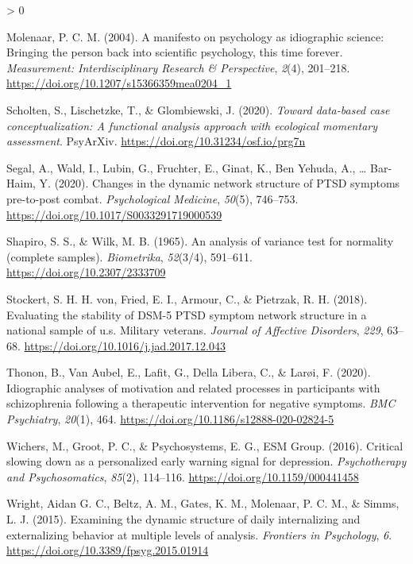 \documentclass[
  english,
  man]{apa6}
\newlength{\cslhangindent}
\newenvironment{CSLReferences}[2] %
 {%
  \setlength{\parindent}{0pt}
  \ifodd #1 \everypar{\setlength{\hangindent}{\cslhangindent}}\ignorespaces\fi
  \ifnum #2 > 0
  \setlength{\parskip}{#2\baselineskip}
  \fi
 }%
 {}
\begin{document}
\begin{CSLReferences}{1}{0}
\leavevmode\hypertarget{ref-Molenaar2004}{}%
Molenaar, P. C. M. (2004). A manifesto on psychology as idiographic science: Bringing the person back into scientific psychology, this time forever. \emph{Measurement: Interdisciplinary Research \& Perspective}, \emph{2}(4), 201--218. \url{https://doi.org/10.1207/s15366359mea0204_1}

\leavevmode\hypertarget{ref-ScholtenEtAl2020}{}%
Scholten, S., Lischetzke, T., \& Glombiewski, J. (2020). \emph{Toward data-based case conceptualization: A functional analysis approach with ecological momentary assessment}. PsyArXiv. \url{https://doi.org/10.31234/osf.io/prg7n}

\leavevmode\hypertarget{ref-SegalEtAl2020}{}%
Segal, A., Wald, I., Lubin, G., Fruchter, E., Ginat, K., Ben Yehuda, A., \ldots{} Bar-Haim, Y. (2020). Changes in the dynamic network structure of PTSD symptoms pre-to-post combat. \emph{Psychological Medicine}, \emph{50}(5), 746--753. \url{https://doi.org/10.1017/S0033291719000539}

\leavevmode\hypertarget{ref-ShapiroWilk1965}{}%
Shapiro, S. S., \& Wilk, M. B. (1965). An analysis of variance test for normality (complete samples). \emph{Biometrika}, \emph{52}(3/4), 591--611. \url{https://doi.org/10.2307/2333709}

\leavevmode\hypertarget{ref-vonStockertEtAl2018}{}%
Stockert, S. H. H. von, Fried, E. I., Armour, C., \& Pietrzak, R. H. (2018). Evaluating the stability of DSM-5 PTSD symptom network structure in a national sample of u.s. Military veterans. \emph{Journal of Affective Disorders}, \emph{229}, 63--68. \url{https://doi.org/10.1016/j.jad.2017.12.043}

\leavevmode\hypertarget{ref-ThononEtAl2020}{}%
Thonon, B., Van Aubel, E., Lafit, G., Della Libera, C., \& Larøi, F. (2020). Idiographic analyses of motivation and related processes in participants with schizophrenia following a therapeutic intervention for negative symptoms. \emph{BMC Psychiatry}, \emph{20}(1), 464. \url{https://doi.org/10.1186/s12888-020-02824-5}

\leavevmode\hypertarget{ref-WichersEtAl2016}{}%
Wichers, M., Groot, P. C., \& Psychosystems, E. G., ESM Group. (2016). Critical slowing down as a personalized early warning signal for depression. \emph{Psychotherapy and Psychosomatics}, \emph{85}(2), 114--116. \url{https://doi.org/10.1159/000441458}

\leavevmode\hypertarget{ref-WrightEtAl2015a}{}%
Wright, Aidan G. C., Beltz, A. M., Gates, K. M., Molenaar, P. C. M., \& Simms, L. J. (2015). Examining the dynamic structure of daily internalizing and externalizing behavior at multiple levels of analysis. \emph{Frontiers in Psychology}, \emph{6}. \url{https://doi.org/10.3389/fpsyg.2015.01914}


\end{CSLReferences}
\end{document}
